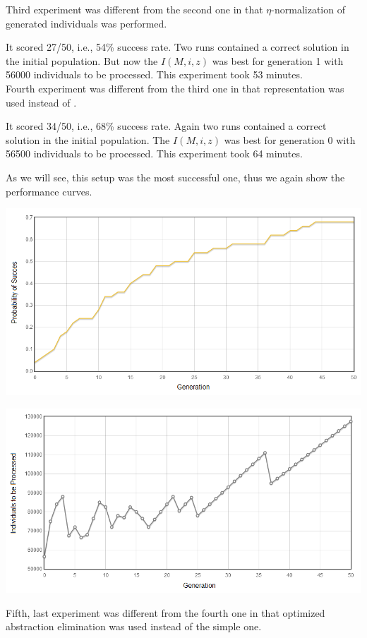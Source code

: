 \documentclass[12pt,a4paper]{report}
\begin{document}
Third experiment was different from the second one in that 
$\eta$-normalization of generated individuals was performed.

It scored 27/50, i.e., 54\% success rate. 
Two runs contained a correct solution in the initial population.
But now the $I(M,i,z)$ was best for generation 1 with 56000
 individuals to be processed.
This experiment took 53 minutes.\\


Fourth experiment was different from the third one in that
\atTree representation was used instead of \sexprTree.

It scored 34/50, i.e., 68\% success rate. Again two runs
contained a correct solution in the initial population.
The $I(M,i,z)$ was best for generation 0 with 56500 
individuals to be processed.
This experiment took 64 minutes.

As we will see, this setup was the most successful one,
thus we again show the performance curves.

\includegraphics[scale=0.65]{reports/ep/report4/probabs.png}

\includegraphics[scale=0.65]{reports/ep/report4/indivs.png}

Fifth, last experiment was different from the fourth one in that
optimized abstraction elimination was used instead of the simple one.
\end{document}
